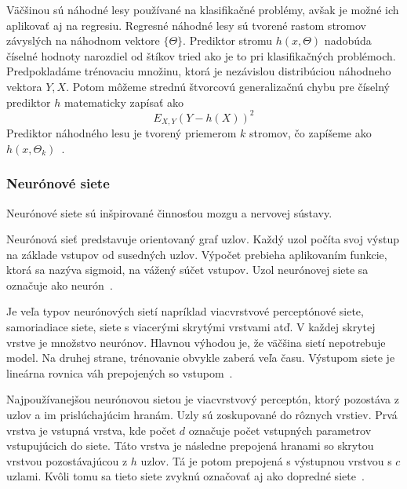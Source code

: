 \documentclass[a4paper,slovak,12pt,appendix]{article}
\begin{document}
Väčšinou sú náhodné lesy používané na klasifikačné problémy, avšak je možné ich
aplikovať aj na regresiu. Regresné náhodné lesy sú tvorené rastom stromov
závyslých na náhodnom vektore $\{\Theta\}$. Prediktor stromu $h(x, \Theta)$
nadobúda číselné hodnoty narozdiel od štíkov tried ako je to pri klasifikačných
problémoch. Predpokladáme trénovaciu množinu, ktorá je nezávislou distribúciou
náhodneho vektora $Y, X$. Potom môžeme strednú štvorcovú generalizačnú chybu
pre číselný prediktor $h$ matematicky zapísať ako
\begin{equation}
  E_{X, Y} (Y - h(X))^2
  \label{eq-random-error}
\end{equation}
Prediktor náhodného lesu je tvorený priemerom $k$ stromov, čo zapíšeme ako
$h(x, \Theta_k)$~\cite{Breiman2001}.


\subsubsection{Neurónové siete}
Neurónové siete sú inšpirované činnosťou mozgu a nervovej sústavy.

Neurónová sieť predstavuje orientovaný graf uzlov. Každý uzol počíta svoj
výstup na základe vstupov od susedných uzlov. Výpočet prebieha aplikovaním
funkcie, ktorá sa nazýva sigmoid, na vážený súčet vstupov. Uzol neurónovej
siete sa označuje ako neurón~\cite{Gruau1994}.

Je veľa typov neurónových sietí napríklad viacvrstvové perceptónové siete,
samoriadiace siete, siete s viacerými skrytými vrstvami atď. V každej skrytej
vrstve je množstvo neurónov. Hlavnou výhodou je, že väčšina sietí nepotrebuje
model. Na druhej strane, trénovanie obvykle zaberá veľa času. Výstupom siete
je lineárna rovnica váh prepojených so vstupom~\cite{KumarSingh2013}.

Najpoužívanejšou neurónovou sietou je viacvrstvový perceptón, ktorý pozostáva
z uzlov a im prislúchajúcim hranám. Uzly sú zoskupované do rôznych vrstiev.
Prvá vrstva je vstupná vrstva, kde počet $d$ označuje počet vstupných parametrov
vstupujúcich do siete. Táto vrstva je následne prepojená hranami so skrytou
vrstvou pozostávajúcou z $h$ uzlov. Tá je potom prepojená s výstupnou vrstvou
s $c$ uzlami. Kvôli tomu sa tieto siete zvyknú označovať aj ako dopredné
siete~\cite{Merz1998}.
\end{document}
